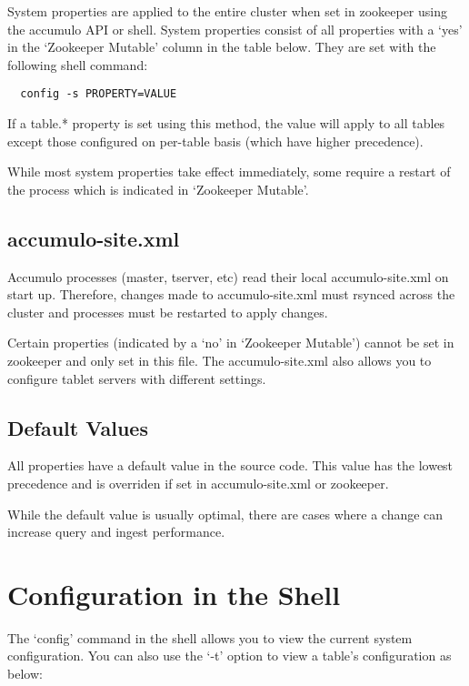 System properties are applied to the entire cluster when set in zookeeper using the accumulo API or shell.  System properties consist of all properties with a `yes' in the `Zookeeper Mutable' column in the table below.  They are set with the following shell command:
\begingroup\fontsize{8pt}{8pt}\selectfont\begin{verbatim}
  config -s PROPERTY=VALUE
\end{verbatim}\endgroup

If a table.* property is set using this method, the value will apply to all tables except those configured on per-table basis (which have higher precedence).

While most system properties take effect immediately, some require a restart of the process which is indicated in `Zookeeper Mutable'.

\subsection{accumulo-site.xml}

Accumulo processes (master, tserver, etc) read their local accumulo-site.xml on start up.  Therefore, changes made to accumulo-site.xml must rsynced across the cluster and processes must be restarted to apply changes.

Certain properties (indicated by a `no' in `Zookeeper Mutable') cannot be set in zookeeper and only set in this file.  The accumulo-site.xml also allows you to configure tablet servers with different settings.

\subsection{Default Values}

All properties have a default value in the source code.  This value has the lowest precedence and is overriden if set in accumulo-site.xml or zookeeper.

While the default value is usually optimal, there are cases where a change can increase query and ingest performance.

\section{Configuration in the Shell}

The `config' command in the shell allows you to view the current system configuration.  You can also use the `-t' option to view a table's configuration as below:

